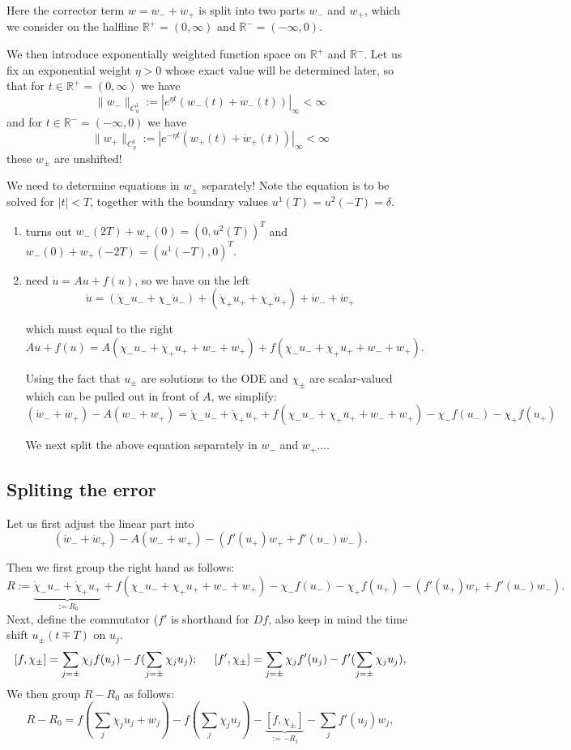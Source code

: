 \documentclass[letterpaper,11pt]{article}
\numberwithin{equation}{section}
\theoremstyle{plain}
\begin{document}
Here the corrector term $w=w_-+w_+$ is split into two parts $w_-$ and $w_+$, which we consider on the halfline $\mathbb{R}^+ = (0,\infty)$ and $\mathbb{R}^- = (-\infty,0)$.

We then introduce exponentially weighted function space on $\mathbb{R}^+$ and $\mathbb{R}^-$. Let us fix an exponential weight $\eta>0$ whose exact value will be determined later, so that for $t \in \mathbb{R}^+ =(0,\infty)$ we have
\[
\|w_-\|_{C^1_\eta}:=|e^{\eta t} (w_-(t)+\dot{w}_-(t))|_{\infty} < \infty 
\]   
and for $t \in \mathbb{R}^- =(-\infty,0)$ we have
\[
\|w_+\|_{C^1_\eta}:= |e^{-\eta t} (w_+(t)+\dot{w}_+(t))|_{\infty} < \infty
\]
these $w_\pm$ are unshifted!     




We need to determine equations in $w_{\pm}$ separately! Note the equation is to be solved for $|t|<T$, together with the boundary values $u^1(T) = u^2(-T) = \delta$.

\begin{enumerate}
\item turns out $w_-(2T)+w_+(0) =  (0,u^2(T))^T$ and $w_-(0)+w_+(-2T)=(u^1(-T),0)^T$. 

\item need $\dot{u} = Au+ f(u)$, so we have on the left
\[
\dot{u}=(\dot{\chi}_- u_- +\chi_- \dot{u}_- )+(\dot{\chi}_+ u_+ +\chi_+ \dot{u}_+ )+\dot{w}_-+\dot{w}_+
\]

which must equal to the right
\[
Au+f(u)=A(\chi_- u_- + \chi_+ u_+ + w_-+w_+)+f(\chi_- u_- + \chi_+ u_+ + w_-+w_+).
\]

Using the fact that $u_{\pm}$ are solutions to the ODE and $\chi_{\pm}$ are scalar-valued which can be pulled out in front of $A$, we simplify:
\[
(\dot{w}_-+\dot{w}_+)-A(w_-+w_+) =  \dot{\chi}_-  u_- + \dot{\chi}_+ u_+ + f(\chi_-u_-+\chi_+u_+ + w_- + w_+) - \chi_- f(u_-)-\chi_+f(u_+)
\]

We next split the above equation separately in $w_-$ and $w_+$....			
\end{enumerate}

\subsection{Spliting the error}
Let us first adjust the linear part into
\[
(\dot{w}_-+\dot{w}_+)-A(w_-+w_+) -(f'(u_+)w_+ +f'(u_-)w_-).
\]

Then we first group the right hand as follows:
\[
R:=\underbrace{ \dot{\chi}_-  u_- + \dot{\chi}_+ u_+}_{:=R_0} + f(\chi_-u_-+\chi_+u_+ + w_- + w_+) - \chi_- f(u_-)-\chi_+f(u_+)-(f'(u_+)w_+ +f'(u_-)w_-).
\]
Next, define the commutator ($f'$ is shorthand for $Df$, also keep in mind the time shift $u_\pm(t\mp T)$ on $u_j$.
\[
[f,\chi_{\pm}] = \sum_{j=\pm} \chi_j f(u_j) - f(\sum_{j=\pm} \chi_ju_j); \hspace{0.2in} [f',\chi_{\pm}] = \sum_{j=\pm} \chi_j f'(u_j) - f'(\sum_{j=\pm} \chi_ju_j),
\]
We then group $R-R_0$ as follows:
\[
R-R_0 =  f(\sum_j \chi_ju_j + w_j) - f(\sum_j \chi_j u_j) -\underbrace{ [f,\chi_{\pm}] }_{:= -R_1}-\sum_{j} f'(u_j)w_j,
\]
\end{document}

